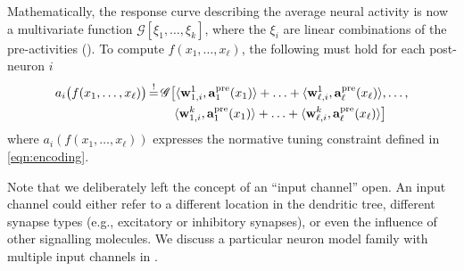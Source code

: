Mathematically, the response curve describing the average neural activity is now a multivariate function $\mathscr{G}[\xi_1, \ldots, \xi_k]$, where the $\xi_i$ are linear combinations of the pre-activities ().
To compute $f(x_1, \ldots, x_\ell)$, the following must hold for each post-neuron $i$
\begin{align}
	\begin{aligned}
	a_i\bigl(f(x_1, \ldots, x_\ell)\bigr) &\operatorname{\overset{!}{=}}
	\mathscr{G} \bigl[
		\langle \mathbf{w}_{1, i}^1, \mathbf{a}^\mathrm{pre}_1(x_1) \rangle + \ldots +
		\langle \mathbf{w}_{\ell, i}^1, \mathbf{a}^\mathrm{pre}_\ell(x_\ell) \rangle, \ldots,\\
	&~\hspace{1.86em}
		\langle \mathbf{w}_{1, i}^k, \mathbf{a}^\mathrm{pre}_1(x_1) \rangle + \ldots +
		\langle \mathbf{w}_{\ell, i}^k, \mathbf{a}^\mathrm{pre}_\ell(x_\ell) \rangle
	\bigr]
	\end{aligned}
	\label{eqn:dendritic}
\end{align}
where $a_i(f(x_1, \ldots, x_\ell))$ expresses the normative tuning constraint defined in \cref{eqn:encoding}.

Note that we deliberately left the concept of an \enquote{input channel} open.
An input channel could either refer to a different location in the dendritic tree, different synapse types (e.g., excitatory or inhibitory synapses), or even the influence of other signalling molecules.
We discuss a particular neuron model family with multiple input channels in .

